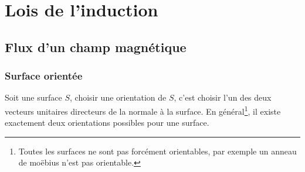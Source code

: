 \documentclass{cours}
\begin{document}
\setcounter{chapter}{24}
\chapter{Lois de l'induction}
\section{Flux d'un champ magnétique}%
\label{sec:flux_d_un_champ_magnetique}

\subsection{Surface orientée}%
\label{sub:surface_orientee}

Soit une surface $S$, choisir une orientation de $S$, c'est choisir l'un des deux vecteurs unitaires directeurs de la normale à la surface. En général\footnote{Toutes les surfaces ne sont pas forcément orientables, par exemple un anneau de moëbius n'est pas orientable.}, il existe exactement deux orientations possibles pour une surface.
\begin{center}
\end{center}
\end{document}
